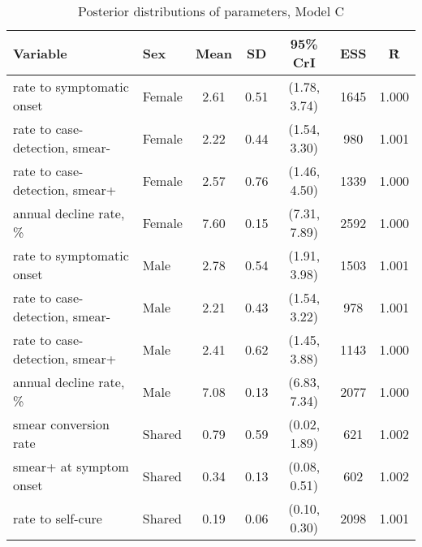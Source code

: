 \begin{table}[h]

\caption{\label{tab:}Posterior distributions of parameters, Model C}
\centering
\begin{tabular}[t]{llccccc}
\toprule
Variable & Sex & Mean & SD & 95\% CrI & ESS & \^{R}\\
\midrule
rate to symptomatic onset & Female & 2.61 & 0.51 & (1.78, 3.74) & 1645 & 1.000\\
rate to case-detection, smear- & Female & 2.22 & 0.44 & (1.54, 3.30) & 980 & 1.001\\
rate to case-detection, smear+ & Female & 2.57 & 0.76 & (1.46, 4.50) & 1339 & 1.000\\
annual decline rate, \% & Female & 7.60 & 0.15 & (7.31, 7.89) & 2592 & 1.000\\
\addlinespace
rate to symptomatic onset & Male & 2.78 & 0.54 & (1.91, 3.98) & 1503 & 1.001\\
rate to case-detection, smear- & Male & 2.21 & 0.43 & (1.54, 3.22) & 978 & 1.001\\
rate to case-detection, smear+ & Male & 2.41 & 0.62 & (1.45, 3.88) & 1143 & 1.000\\
annual decline rate, \% & Male & 7.08 & 0.13 & (6.83, 7.34) & 2077 & 1.000\\
\addlinespace
smear conversion rate & Shared & 0.79 & 0.59 & (0.02, 1.89) & 621 & 1.002\\
smear+ at symptom onset & Shared & 0.34 & 0.13 & (0.08, 0.51) & 602 & 1.002\\
rate to self-cure & Shared & 0.19 & 0.06 & (0.10, 0.30) & 2098 & 1.001\\
\bottomrule
\end{tabular}
\end{table}
